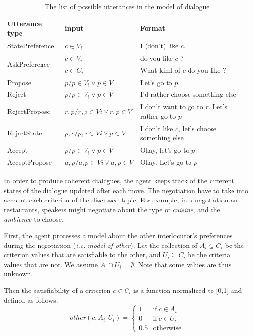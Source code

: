 \documentclass{article}
\begin{document}
		\begin{table}[h]
			\begin{tabular} {|p{2.5cm}|p{3.5cm}|p{6cm}|}
				\hline
				Utterance type & input & Format \\
				\hline
				StatePreference & $c \in V_i$ & I (don't) like $c$.\\
				\hline
				 \multirow{2}{*}{AskPreference} &$c \in V_i$ & do you like $c$ ?\\
				 \cline{2-3}
				 & $c \in C_i$ & What kind of $c$ do you like ? \\
				 \hline
				 Propose & $p / p\in V_i \vee p \in V$ & Let's go to $p$. \\
				 \hline
				 Reject & $p / p\in V_i \vee p \in V$ & I'd rather choose  something else \\
				 \hline
				 RejectPropose & $r, p / r,p\in Vi \vee r,p \in V $ & I don't want to go to $r$. Let's rather go to $p$ \\
				 \hline 
				 RejectState & $ p,c / p,c\in Vi \vee p \in V$ &  I don't like $c$, let's choose something else \\
				 \hline
				 Accept& $p / p\in V_i \vee p \in V$& Okay, let's go to $p$	 \\
				 \hline
				 AcceptPropose & $a,p / a,p\in Vi \vee a,p \in V $ & Okay. Let's go to $p$\\
				 \hline
			\end{tabular}
			\caption{The list of possible utterances in the model of dialogue}
		\end{table}
	
	In order to produce coherent dialogues, the agent keeps track of the different states of the dialogue updated after each move. 
	The negotiation have to take into account each criterion of the discussed topic. For example, in a negotiation on restaurants, speakers might negotiate about the type of \textit{cuisine}, and the \textit{ambiance} to choose.  
	
	First, the agent processes a model about the other interlocutor's preferences during the negotiation (\textit{i.e. model of other}). Let the collection of $A_i \subseteq C_i$ be the criterion values that are satisfiable to the other, and $U_i \subseteq C_i$ be the criteria values that are not.  We assume $A_i \cap U_i = \emptyset$.  Note that some values are thus unknown.
	
	Then the satisfiability of a criterion $c \in C_i$ is a function normalized to [0,1] and defined as follows.
	\begin{equation}
	other(c, A_i, U_i)= \left\{\begin{array}{ll}
	1	 & \mathrm{if\ }  c \in A_i\\
	0    & \mathrm{if\ }c \in U_i\\
	0.5	 & \mathrm{otherwise}
	\end{array}\right.
	\end{equation}
	
\end{document}

